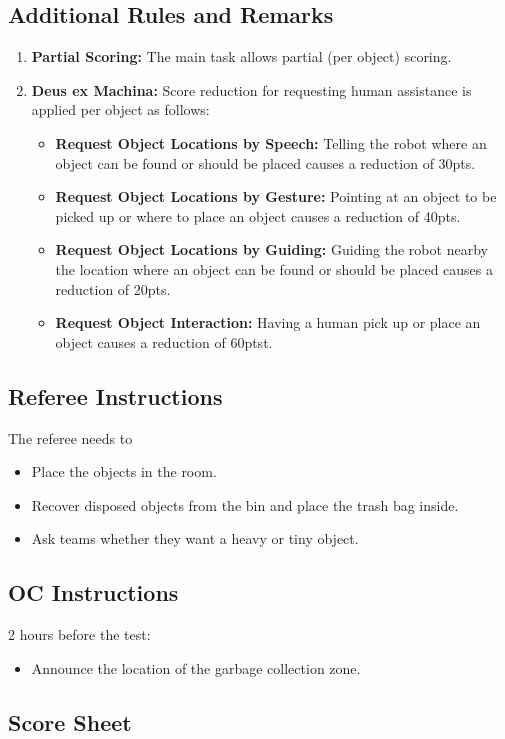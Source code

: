 \subsection*{Additional Rules and Remarks}
\begin{enumerate}[nosep]
	\item \textbf{Partial Scoring:} The main task allows partial (per object) scoring.
	
	\item \textbf{Deus ex Machina:} Score reduction for requesting human assistance is applied per object as follows:
	\begin{itemize}[nosep]
		\item \textbf{Request Object Locations by Speech:} Telling the robot where an object can be found or should be placed causes a reduction of 30pts.
		
		\item \textbf{Request Object Locations by Gesture:} Pointing at an object to be picked up or where to place an object causes a reduction of 40pts.
		
		\item \textbf{Request Object Locations by Guiding:} Guiding the robot nearby the location where an object can be found or should be placed causes a reduction of 20pts.
		
		\item \textbf{Request Object Interaction:} Having a human pick up or place an object causes a reduction of 60ptst.
	\end{itemize}
\end{enumerate}

\newpage

\subsection*{Referee Instructions}
The referee needs to
\begin{itemize}
	\item Place the objects in the room.
	\item Recover disposed objects from the bin and place the trash bag inside.
	\item Ask teams whether they want a heavy or tiny object.
\end{itemize}

\subsection*{OC Instructions}
2 hours before the test:
\begin{itemize}
	\item Announce the location of the garbage collection zone.
\end{itemize}

\subsection*{Score Sheet}


